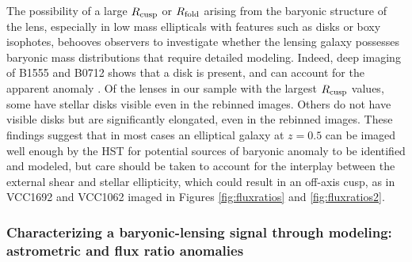 The possibility of a large $R_{\rm{cusp}}$ or $R_{\rm{fold}}$ arising from the baryonic structure of the lens, especially in low mass ellipticals with features such as disks or boxy isophotes, behooves observers to investigate whether the lensing galaxy possesses baryonic mass distributions that require detailed modeling. Indeed, deep imaging of B1555 and B0712 shows that a disk is present, and can account for the apparent anomaly \cite{Hsueh++16}. Of the lenses in our sample with the largest $R_{\rm{cusp}}$ values, some have stellar disks visible even in the rebinned images. Others do not have visible disks but are significantly elongated, even in the rebinned images. These findings suggest that in most cases an elliptical galaxy at $z=0.5$ can be imaged well enough by the HST for potential sources of baryonic anomaly to be identified and modeled, but care should be taken to account for the interplay between the external shear and stellar ellipticity, which could result in an off-axis cusp, as in VCC1692 and VCC1062 imaged in Figures \ref{fig:fluxratios} and \ref{fig:fluxratios2}.

\subsubsection{Characterizing a baryonic-lensing signal through modeling: astrometric and flux ratio anomalies}  

